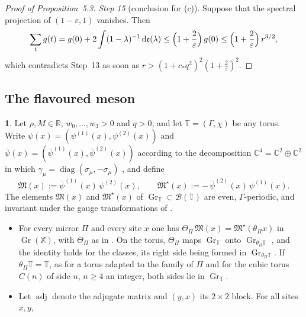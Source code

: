 \documentclass[11pt]{amsart}
\newcommand{\namedhead}{}
\theoremstyle{definition}
\newtheorem*{namedinner}{\namedhead}
\newenvironment{named}[1]{\renewcommand{\namedhead}{#1}\begin{namedinner}}{\end{namedinner}}
\begin{document}
\begin{proof}[Proof of Proposition~5.3]
\emph{Step 15} (conclusion for (c)).
Suppose that the spectral projection of $(1-\varepsilon,1)$ vanishes.
Then
\begin{equation*}
\sum_tg(t)=g(0)+2\int(1-\lambda)^{-1}\,\mathrm d\mathfrak e(\lambda)\le\Bigl(1+\frac2\varepsilon\Bigr)\,g(0)\le\Bigl(1+\frac2\varepsilon\Bigr)\,r^{3/2},
\end{equation*}
which contradicts Step~13 as soon as $r>(1+c_*q^2)^2(1+\frac2\varepsilon)^2$.
\end{proof}

\subsection{The flavoured meson}
\begin{named}{Proposition 5.4}
Let $\rho,M\in\mathbb R$, $w_0,\dots,w_3>0$ and $q>0$, and let $\mathbb T=(\Gamma,\chi)$ be any torus.
Write $\psi(x)=(\psi^{(1)}(x),\psi^{(2)}(x))$ and $\bar\psi(x)=(\bar\psi^{(1)}(x),\bar\psi^{(2)}(x))$ according to the decomposition $\mathbb C^4=\mathbb C^2\oplus\mathbb C^2$ in which $\gamma_\mu=\operatorname{diag}(\sigma_\mu,-\sigma_\mu)$ \cite[Definition~2.7]{QEDII}, and define
\begin{equation*}
\mathfrak M(x):=\bar\psi^{(1)}(x)\,\psi^{(2)}(x),\qquad\mathfrak M^\star(x):=-\,\bar\psi^{(2)}(x)\,\psi^{(1)}(x).
\end{equation*}
The elements $\mathfrak M(x)$ and $\mathfrak M^\star(x)$ of $\operatorname{Gr}_{\mathbb T}\subset\mathcal B(\mathbb T)$ are even, $\Gamma$-periodic, and invariant under the gauge transformations of \cite[Definition~2.10]{QEDII}.
\begin{itemize}
\item[(a)] For every mirror $\Pi$ and every site $x$ one has $\Theta_\Pi\,\mathfrak M(x)=\mathfrak M^\star(\theta_\Pi x)$ in $\operatorname{Gr}(\mathbb X)$, with $\Theta_\Pi$ as in \cite[Definition~2.9]{QEDII}.
On the torus, $\Theta_\Pi$ maps $\operatorname{Gr}_{\mathbb T}$ onto $\operatorname{Gr}_{\theta_\Pi\mathbb T}$ \cite[Lemma~3.12]{QEDII}, and the identity holds for the classes, its right side being formed in $\operatorname{Gr}_{\theta_\Pi\mathbb T}$.
If $\theta_\Pi\mathbb T=\mathbb T$, as for a torus adapted to the family of $\Pi$ \cite[Section~1.1]{QEDII} and for the cubic torus $C(n)$ of side $n$, $n\ge4$ an integer, both sides lie in $\operatorname{Gr}_{\mathbb T}$.
\item[(b)] Let $\operatorname{adj}$ denote the adjugate matrix and $(y,x)$ its $2\times2$ block.
For all sites $x,y$,
\begin{equation*}

\end{equation*}
\end{itemize}
\end{named}
\end{document}
